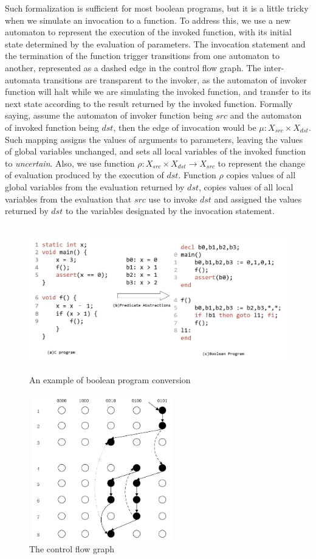 \documentclass[10pt,journal,final,]{article}
\theoremstyle{definition}
\begin{document}
Such formalization is sufficient for most boolean programs, but it is a little tricky when we simulate an invocation to a function.
To address this, we use a new automaton to represent the execution of the invoked function, with its initial state determined by the evaluation of parameters.
The invocation statement and the termination of the function trigger transitions from one automaton to another, represented as a dashed edge in the control flow graph.
The inter-automata transitions are transparent to the invoker, as the automaton of invoker function will halt while we are simulating the invoked function, and transfer to its next state according to the result returned by the invoked function.
Formally saying, assume the automaton of invoker function being $src$ and the automaton of invoked function being $dst$, then the edge of invocation would be $\mu:X_{src}\times X_{dst}$. Such mapping assigns the values of arguments to parameters, leaving the values of global variables unchanged, and sets all local variables of the invoked function to {\it uncertain}.
Also, we use function $\rho:X_{src}\times X_{dst} \to X_{src}$ to represent the change of evaluation produced by the execution of $dst$. Function $\rho$ copies values of all global variables from the evaluation returned by $dst$, copies values of all local variables from the evaluation that $src$ use to invoke $dst$ and assigned the values returned by $dst$ to the variables designated by the invocation statement.

\begin{figure}
\centering
\includegraphics[width=5in,height=2.5in]{Fig2-1.jpg}
\caption{An example of boolean program conversion}
\label{fig:BPC}
\end{figure}

\begin{figure}
\centering
\includegraphics[width=2.5in,height=2.5in]{Fig2-2.jpg}
\caption{The control flow graph}
\label{fig:CFG}
\end{figure}
\end{document}
